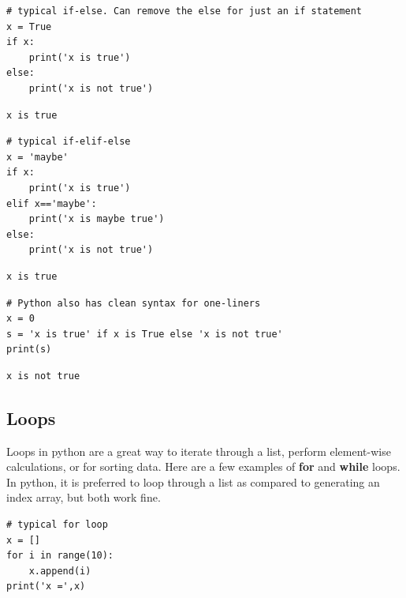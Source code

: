\documentclass[%
oneside,                 %
final,                   %
10pt]{article}
\begin{document}
\begin{Verbatim}[numbers=none,fontsize=\fontsize{9pt}{9pt},baselinestretch=0.95,xleftmargin=2mm]
# typical if-else. Can remove the else for just an if statement
x = True
if x:
    print('x is true')
else:
    print('x is not true')
\end{Verbatim}

\begin{Verbatim}[numbers=none,fontsize=\fontsize{9pt}{9pt},baselinestretch=0.95,xleftmargin=2mm]
x is true
\end{Verbatim}

\begin{Verbatim}[numbers=none,fontsize=\fontsize{9pt}{9pt},baselinestretch=0.95,xleftmargin=2mm]
# typical if-elif-else
x = 'maybe'
if x:
    print('x is true')
elif x=='maybe':
    print('x is maybe true')
else:
    print('x is not true')
\end{Verbatim}

\begin{Verbatim}[numbers=none,fontsize=\fontsize{9pt}{9pt},baselinestretch=0.95,xleftmargin=2mm]
x is true
\end{Verbatim}

\begin{Verbatim}[numbers=none,fontsize=\fontsize{9pt}{9pt},baselinestretch=0.95,xleftmargin=2mm]
# Python also has clean syntax for one-liners
x = 0
s = 'x is true' if x is True else 'x is not true'
print(s)
\end{Verbatim}

\begin{Verbatim}[numbers=none,fontsize=\fontsize{9pt}{9pt},baselinestretch=0.95,xleftmargin=2mm]
x is not true
\end{Verbatim}

\subsection{Loops}

Loops in python are a great way to iterate through a list, perform element-wise calculations, or for sorting data. Here are a few examples of  \textbf{for} and \textbf{while} loops. In python, it is preferred to loop through a list as compared to generating an index array, but both work fine.

\begin{Verbatim}[numbers=none,fontsize=\fontsize{9pt}{9pt},baselinestretch=0.95,xleftmargin=2mm]
# typical for loop
x = []
for i in range(10):
    x.append(i)
print('x =',x)
\end{Verbatim}
\end{document}
